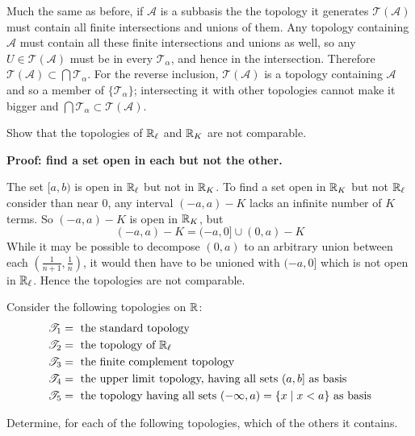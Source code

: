 \documentclass{article}
\begin{document}

Much the same as before, if $\mathscr{A}$ is a subbasis the the topology it generates $\mathscr{T}(\mathscr{A})$ must contain all finite intersections and unions of them. Any topology containing $\mathscr{A}$ must contain all these finite intersections and unions as well, so any $U \in \mathscr{T}(\mathscr{A})$ must be in every $\mathscr{T}_\alpha$, and hence in the intersection. Therefore $\mathscr{T}(\mathscr{A}) \subset \bigcap \mathscr{T}_\alpha$. For the reverse inclusion, $\mathscr{T}(\mathscr{A})$ is a topology containing $\mathscr{A}$ and so a member of $\{\mathscr{T}_\alpha\}$; intersecting it with other topologies cannot make it bigger and $\bigcap \mathscr{T}_\alpha \subset \mathscr{T}(\mathscr{A})$.

\begin{problem}
Show that the topologies of $\mathbb{R}_\ell$ and $\mathbb{R}_K$ are not comparable.
\end{problem}

\textbf{Proof: find a set open in each but not the other.}

The set $[a, b)$ is open in $\mathbb{R}_\ell$ but not in $\mathbb{R}_K$. To find a set open in $\mathbb{R}_K$ but not $\mathbb{R}_\ell$ consider than near 0, any interval $(-a, a) - K$ lacks an infinite number of $K$ terms. So $(-a, a) - K$ is open in $\mathbb{R}_K$, but
    $$(-a, a) - K = (-a, 0] \cup (0, a) -K$$
  While it may be possible to decompose $(0, a)$ to an arbitrary union between each $(\frac{1}{n+1}, \frac{1}{n})$, it would then have to be unioned with $(-a, 0]$ which is not open in $\mathbb{R}_\ell$. Hence the topologies are not comparable.

  \begin{problem}
  Consider the following topologies on $\mathbb{R}$:
  \begin{align*}
    \mathscr{T}_1 & = \text{ the standard topology}                                                          \\
    \mathscr{T}_2 & = \text{ the topology of } \mathbb{R}_\ell                                                       \\
    \mathscr{T}_3 & = \text{ the finite complement topology}                                                 \\
    \mathscr{T}_4 & = \text{ the upper limit topology, having all sets } (a, b] \text{ as basis}             \\
    \mathscr{T}_5 & = \text{ the topology having all sets } (-\infty, a) = \{x \mid x < a\} \text{ as basis}
  \end{align*}

  Determine, for each of the following topologies, which of the others it contains.
  \end{problem}
\end{document}
